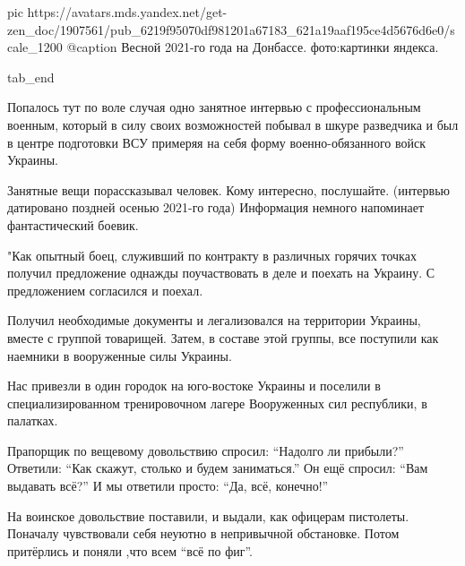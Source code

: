 		 pic https://avatars.mds.yandex.net/get-zen_doc/1907561/pub_6219f95070df981201a67183_621a19aaf195ce4d5676d6e0/scale_1200
		 @caption Весной 2021-го года на Донбассе. фото:картинки яндекса.

  tab_end
\fi

Попалось тут по воле случая одно занятное интервью с профессиональным военным,
который в силу своих возможностей побывал в шкуре разведчика и был в центре
подготовки ВСУ примеряя на себя форму военно-обязанного войск Украины.

Занятные вещи порассказывал человек. Кому интересно, послушайте. (интервью
датировано поздней осенью 2021-го года) Информация немного напоминает
фантастический боевик.

\begin{zznagolos}
"Как опытный боец, служивший по контракту в различных горячих точках получил
предложение однажды поучаствовать в деле и поехать на Украину. С предложением
согласился и поехал. 

Получил необходимые документы и легализовался на территории Украины, вместе
с группой товарищей. Затем, в составе этой группы, все поступили как
наемники в вооруженные силы Украины.	
\end{zznagolos}

Нас привезли в один городок на юго-востоке Украины и поселили в
специализированном тренировочном лагере Вооруженных сил республики, в палатках.

Прапорщик по вещевому довольствию спросил: \enquote{Надолго ли прибыли?}
Ответили: \enquote{Как скажут, столько и будем заниматься.} Он ещё спросил:
\enquote{Вам выдавать всё?} И мы ответили просто: \enquote{Да, всё, конечно!}

На воинское довольствие поставили, и выдали, как офицерам пистолеты. Поначалу
чувствовали себя неуютно в непривычной обстановке. Потом притёрлись и поняли
,что всем \enquote{всё по фиг}.
